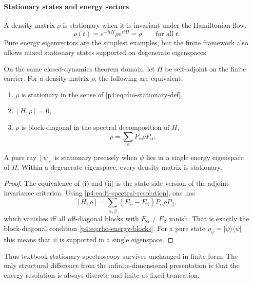 \documentclass[12pt,a4paper]{article}
\begin{document}
\paragraph{Stationary states and energy sectors}
\label{p4:sec:part2-stationary-states}

A density matrix $\rho$ is stationary when it is invariant under the Hamiltonian flow,
\begin{equation}
\label{p4:eq:rho-stationary-def}
\rho(t)=e^{-itH}\rho e^{itH}=\rho
\qquad\text{for all }t.
\end{equation}
Pure energy eigenvectors are the simplest examples, but the finite framework also allows mixed stationary states supported on degenerate eigenspaces.


\begin{theorem}
\label{p4:thm:stationary-states}
On the same closed-dynamics theorem domain, let $H$ be self-adjoint on the finite carrier.
For a density matrix $\rho$, the following are equivalent:
\begin{enumerate}[label=(\roman*), leftmargin=2em]
\item $\rho$ is stationary in the sense of \eqref{p4:eq:rho-stationary-def},
\item $[H,\rho]=0$,
\item $\rho$ is block-diagonal in the spectral decomposition of $H$,
\begin{equation}
\label{p4:eq:rho-energy-blocks}
\rho=\sum_\alpha P_\alpha\rho P_\alpha.
\end{equation}
\end{enumerate}
A pure ray $[\psi]$ is stationary precisely when $\psi$ lies in a single energy eigenspace of $H$.
Within a degenerate eigenspace, every density matrix is stationary.
\end{theorem}


\begin{proof}
The equivalence of (i) and (ii) is the state-side version of the adjoint invariance criterion.
Using \eqref{p4:eq:H-spectral-resolution}, one has
\[
[H,\rho]=\sum_{\alpha,\beta}(E_\alpha-E_\beta)P_\alpha\rho P_\beta,
\]
which vanishes iff all off-diagonal blocks with $E_\alpha\neq E_\beta$ vanish.
That is exactly the block-diagonal condition \eqref{p4:eq:rho-energy-blocks}.
For a pure state $\rho_\psi=\lvert\psi\rangle\!\langle\psi\rvert$ this means that $\psi$ is supported in a single eigenspace.
\end{proof}

Thus textbook stationary spectroscopy survives unchanged in finite form.
The only structural difference from the infinite-dimensional presentation is that the energy resolution is always discrete and finite at fixed truncation.
\end{document}
